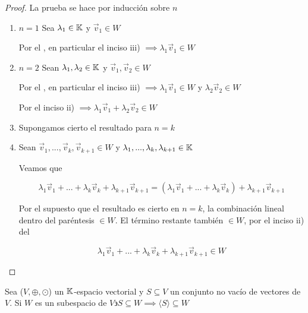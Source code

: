 \begin{proof}
    La prueba se hace por inducción sobre $n$

    \begin{enumerate}
        \item $n=1$ Sea ${\lambda}_{1} \in\mathbb{K}$ y ${\vec{v}}_{1} \in W$

        Por el , en particular el inciso iii) $\implies {\lambda}_{1}{\vec{v}}_{1} \in W $

        \item $n=2$ Sean ${\lambda}_{1},{\lambda}_{2} \in\mathbb{K}$ y ${\vec{v}}_{1},{\vec{v}}_{2} \in W$

        Por el , en particular el inciso iii) $\implies {\lambda}_{1}{\vec{v}}_{1} \in W$ y ${\lambda}_{2}{\vec{v}}_{2} \in W$

        Por el inciso ii) $\implies {\lambda}_{1}{\vec{v}}_{1} + {\lambda}_{2}{\vec{v}}_{2} \in W$

        \item Supongamos cierto el resultado para $n=k$

        \item Sean ${\vec{v}}_{1},...,{\vec{v}}_{k},{\vec{v}}_{k+1} \in W$ y ${\lambda}_{1},...,{\lambda}_{k},{\lambda}_{k+1} \in \mathbb{K}$

        Veamos que 

        \begin{equation*}
            {\lambda}_{1}{\vec{v}}_{1}+...+{\lambda}_{k}{\vec{v}}_{k}+{\lambda}_{k+1}{\vec{v}}_{k+1} = ({\lambda}_{1}{\vec{v}}_{1}+...+{\lambda}_{k}{\vec{v}}_{k})+{\lambda}_{k+1}{\vec{v}}_{k+1}
        \end{equation*}

        Por el supuesto que el resultado es cierto en $n=k$, la combinación lineal dentro del paréntesis $\in W$. El término restante también $\in W$, por el inciso ii) del 

        \begin{equation*}
            {\lambda}_{1}{\vec{v}}_{1}+...+{\lambda}_{k}{\vec{v}}_{k}+{\lambda}_{k+1}{\vec{v}}_{k+1} \in W
        \end{equation*}
    \end{enumerate}
\end{proof}

\begin{theorem} \label{teo17}
    Sea ($V, \oplus, \odot$)  un $\mathbb{K}$-espacio vectorial y $S \subseteq V$ un conjunto no vacío de vectores de $V$. Si $W$ es un subespacio de $V \backepsilon S \subseteq W \implies \langle S \rangle \subseteq W$
\end{theorem}

